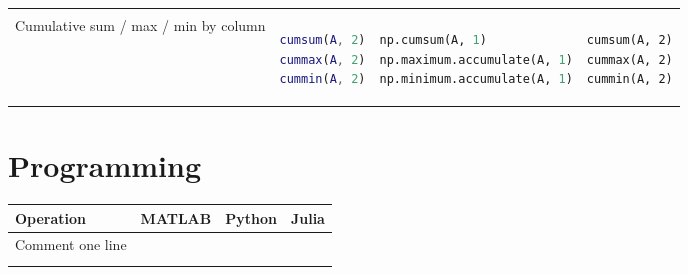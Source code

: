 \documentclass[10pt, landscape]{article}
\begin{document}
\begin{multicols}{2}
\begin{tabular}[]{@{}llll@{}}
\begin{minipage}[t]{0.20\columnwidth}
\end{minipage}\tabularnewline
\begin{minipage}[t]{0.23\columnwidth}\raggedright
Cumulative sum / max / min by column
\end{minipage} & \begin{minipage}[t]{0.22\columnwidth}\raggedright
\begin{lstlisting}[language=Matlab]
cumsum(A, 2)
cummax(A, 2)
cummin(A, 2)
\end{lstlisting}

\end{minipage} & \begin{minipage}[t]{0.24\columnwidth}\raggedright
\begin{lstlisting}[language=Python]
np.cumsum(A, 1)
np.maximum.accumulate(A, 1)
np.minimum.accumulate(A, 1)
\end{lstlisting}

\end{minipage} & \begin{minipage}[t]{0.20\columnwidth}\raggedright
\begin{lstlisting}
cumsum(A, 2)
cummax(A, 2)
cummin(A, 2)
\end{lstlisting}

\end{minipage}\tabularnewline
\bottomrule
\end{tabular}

\section{Programming}\label{programming}

\begin{tabular}[]{@{}llll@{}}
\toprule
\begin{minipage}[b]{0.19\columnwidth}\raggedright
Operation
\end{minipage} & \begin{minipage}[b]{0.22\columnwidth}\raggedright
MATLAB
\end{minipage} & \begin{minipage}[b]{0.22\columnwidth}\raggedright
Python
\end{minipage} & \begin{minipage}[b]{0.25\columnwidth}\raggedright
Julia
\end{minipage}\tabularnewline
\midrule
\begin{minipage}[t]{0.19\columnwidth}\raggedright
Comment one line
\end{minipage} & \begin{minipage}[t]{0.22\columnwidth}\raggedright
\begin{lstlisting}[language=Matlab]
% This is a comment
\end{lstlisting}


\end{minipage}
\end{tabular}
\end{multicols}
\end{document}
